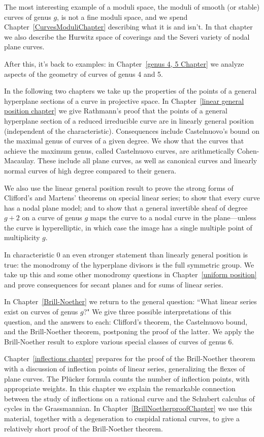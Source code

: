 The most interesting example of a moduli space, the moduli of smooth (or stable) curves of genus $g$, is not a fine moduli space, and we spend Chapter~\ref{CurvesModuliChapter} describing what it is and isn't. In that chapter we also describe the Hurwitz space of coverings and the Severi variety of nodal plane curves.

After this, it's back to examples: in Chapter~\ref{genus 4, 5 Chapter} we analyze aspects of the geometry of curves of genus 4 and 5.  

In the following two chapters we take up 
the properties of the points of a general hyperplane sections of a curve in projective space. 
In Chapter~\ref{linear general position chapter} we give Rathmann's proof that
the points of a general hyperplane section of a reduced irreducible curve are in linearly general position (independent of the characteristic).
Consequences include Castelnuovo's bound  on the maximal genus of curves of a given degree.
We show that the curves that achieve the maximum genus, called Castelnuovo curves,
are arithmetically Cohen-Macaulay. These include all plane curves, as well as
canonical curves and linearly normal curves of high degree compared to their genera. 

We also
use the linear general position result to prove the strong forms of Clifford's and Martens' theorems
on special linear series; to show that every curve has a nodal plane model; and to show that a 
general invertible sheaf  of degree $g+2$ on a curve of genus $g$  maps the curve to a nodal curve
in the plane---unless the curve is hyperelliptic, in which case the image has a single multiple point of
multiplicity $g$.

In characteristic 0 an even stronger statement than linearly general position is true: the monodromy of the hyperplane divisors is the full symmetric group. We take up this
and some other monodromy questions in Chapter~\ref{uniform position} and prove consequences
for secant planes and for sums of linear series.

In Chapter~\ref{Brill-Noether} we return to the general question: ``What linear series exist on curves of genus $g$?" We give three possible interpretations of this question, and the answers to each: Clifford's theorem, the Castelnuovo bound, and the Brill-Noether theorem, postponing the proof of the latter. 
We apply the Brill-Noether result to explore  various special classes of curves of genus 6.

Chapter~\ref{inflections chapter} prepares for the proof of the Brill-Noether theorem 
with a discussion of inflection points of linear series, generalizing the flexes of plane curves. The Pl\"ucker formula
counts the number of inflection points, with appropriate weights. In this chapter we explain
the remarkable connection between the study of inflections on a rational curve and the Schubert calculus of cycles in the Grassmannian. In Chapter~\ref{BrillNoetherproofChapter} we use this material, together with a degeneration to cuspidal rational curves, to give a relatively short proof of the Brill-Noether theorem.

